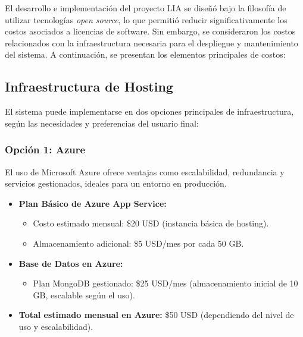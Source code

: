 
El desarrollo e implementación del proyecto LIA se diseñó bajo la filosofía de utilizar tecnologías \textit{open source}, lo que permitió reducir significativamente los costos asociados a licencias de software. Sin embargo, se consideraron los costos relacionados con la infraestructura necesaria para el despliegue y mantenimiento del sistema. A continuación, se presentan los elementos principales de costos:

\subsection{Infraestructura de Hosting}
El sistema puede implementarse en dos opciones principales de infraestructura, según las necesidades y preferencias del usuario final:

\subsubsection{Opción 1: Azure}
El uso de Microsoft Azure ofrece ventajas como escalabilidad, redundancia y servicios gestionados, ideales para un entorno en producción.
\begin{itemize}
    \item \textbf{Plan Básico de Azure App Service:} 
    \begin{itemize}
        \item Costo estimado mensual: \$20 USD (instancia básica de hosting).
        \item Almacenamiento adicional: \$5 USD/mes por cada 50 GB.
    \end{itemize}
    \item \textbf{Base de Datos en Azure:}
    \begin{itemize}
        \item Plan MongoDB gestionado: \$25 USD/mes (almacenamiento inicial de 10 GB, escalable según el uso).
    \end{itemize}
    \item \textbf{Total estimado mensual en Azure:} \$50 USD (dependiendo del nivel de uso y escalabilidad).
\end{itemize}

